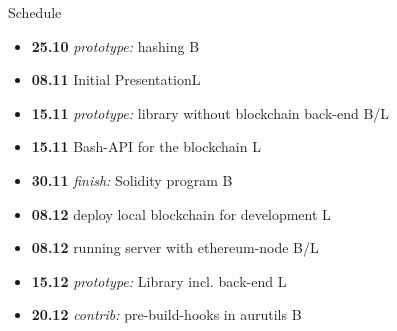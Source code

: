\documentclass{beamer}
\begin{document}
\begin{frame}{Schedule}
\begin{itemize}
	\item \textbf{25.10} \emph{prototype:} hashing \hfill B
	\item \textbf{08.11} \alert{Initial Presentation}\hfill L
	\item \textbf{15.11} \emph{prototype:} library without blockchain back-end \hfill B/L
	\item \textbf{15.11} Bash-API for the blockchain \hfill L
	\item \textbf{30.11} \emph{finish:} \alert{Solidity program} \hfill B
	\item \textbf{08.12} deploy local blockchain for development \hfill L
	\item \textbf{08.12} running server with ethereum-node \hfill B/L
	\item \textbf{15.12} \emph{prototype:} \alert{Library} incl. back-end \hfill L
	\item \textbf{20.12} \emph{contrib:} pre-build-hooks in aurutils \hfill B
\end{itemize}
\end{frame}
\end{document}
